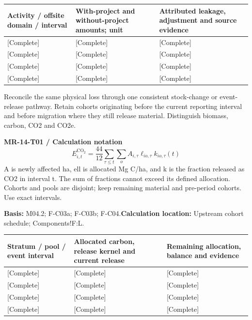 {\sffamily\fontsize{8.6}{10.7}\selectfont\begin{longtable}{@{}P{48mm}P{61mm}P{53mm}@{}}
\toprule
\textbf{Activity / offsite domain / interval} & \textbf{With-project and without-project amounts; unit} & \textbf{Attributed leakage, adjustment and source evidence}\\\midrule\endhead
\rule{0pt}{8mm}[Complete] & [Complete] & [Complete]\\\hline
\rule{0pt}{8mm}[Complete] & [Complete] & [Complete]\\\hline
\rule{0pt}{8mm}[Complete] & [Complete] & [Complete]\\\hline
\rule{0pt}{8mm}[Complete] & [Complete] & [Complete]\\\hline
\end{longtable}}
Reconcile the same physical loss through one consistent stock-change or event-release pathway. Retain cohorts originating before the current reporting interval and before migration where they still release material. Distinguish biomass, carbon, CO2 and CO2e.\par
{}
\par\begingroup\sffamily\fontsize{8.4}{10.5}\selectfont\color{NEBGreen}
\textbf{MR-14-T01 / Calculation notation}\
{\fontsize{10}{12}\selectfont\[E^{\mathrm{CO_2}}_{i,t}=\frac{44}{12}\sum_{\tau\le t}\sum_o A_{i,\tau}\ell_{io,\tau}k_{io,\tau}(t)\]}
A is newly affected ha, ell is allocated Mg C/ha, and k is the fraction released as CO2 in interval t. The sum of fractions cannot exceed its defined allocation. Cohorts and pools are disjoint; keep remaining material and pre-period cohorts. Use exact intervals.\par
\textbf{Basis:} M04.2; F-C03a; F-C03b; F-C04.\quad\textbf{Calculation location:} Upstream cohort schedule; Components!F:L.\par\endgroup
{\sffamily\fontsize{8.6}{10.7}\selectfont\begin{longtable}{@{}P{48mm}P{61mm}P{53mm}@{}}
\toprule
\textbf{Stratum / pool / event interval} & \textbf{Allocated carbon, release kernel and current release} & \textbf{Remaining allocation, balance and evidence}\\\midrule\endhead
\rule{0pt}{8mm}[Complete] & [Complete] & [Complete]\\\hline
\rule{0pt}{8mm}[Complete] & [Complete] & [Complete]\\\hline
\rule{0pt}{8mm}[Complete] & [Complete] & [Complete]\\\hline
\rule{0pt}{8mm}[Complete] & [Complete] & [Complete]\\\hline
\end{longtable}}
